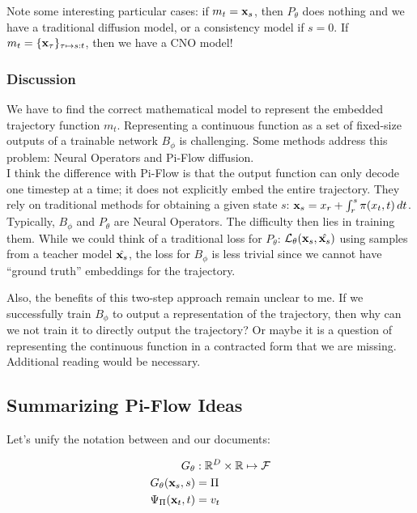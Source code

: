 \noindent Note some interesting particular cases: if $m_t = \mathbf{x}_s$, then $P_{\theta}$ does nothing and we have a traditional diffusion model, or a consistency model if $s = 0$. If $m_t = \{\mathbf{x}_{\tau}\}_{\tau \mapsto s:t}$, then we have a CNO model!

\subsubsection{Discussion}

We have to find the correct mathematical model to represent the embedded trajectory function $m_t$. Representing a continuous function as a set of fixed-size outputs of a trainable network $B_{\phi}$ is challenging. Some methods address this problem: Neural Operators and Pi-Flow diffusion. \\

\noindent I think the difference with Pi-Flow is that the output function can only decode one timestep at a time; it does not explicitly embed the entire trajectory. They rely on traditional methods for obtaining a given state $s$: $\mathbf{x}_s = x_r + \int^s_r \pi(x_t, t)\, dt$. \\

\noindent Typically, $B_{\phi}$ and $P_{\theta}$ are Neural Operators. The difficulty then lies in training them. While we could think of a traditional loss for $P_{\theta}$: $\mathcal{L}_{\theta}(\mathbf{x}_s, \hat{\mathbf{x}_s})$ using samples from a teacher model $\hat{\mathbf{x}_s}$, the loss for $B_{\phi}$ is less trivial since we cannot have ``ground truth'' embeddings for the trajectory.

\noindent Also, the benefits of this two-step approach remain unclear to me. If we successfully train $B_{\phi}$ to output a representation of the trajectory, then why can we not train it to directly output the trajectory? Or maybe it is a question of representing the continuous function in a contracted form that we are missing. Additional reading would be necessary.

\subsection{Summarizing Pi-Flow Ideas}

Let's unify the notation between \cite{chen2026piflowpolicybasedfewstepgeneration} and our documents:

\begin{align*}
    G_{\theta} & : \mathbb{R}^D \times \mathbb{R} \mapsto \mathcal{F} \\
    G_{\theta}(\mathbf{x}_s, s) & = \Pi \\
    \Psi_{\Pi}(\mathbf{x}_t, t) &= v_t
\end{align*}

